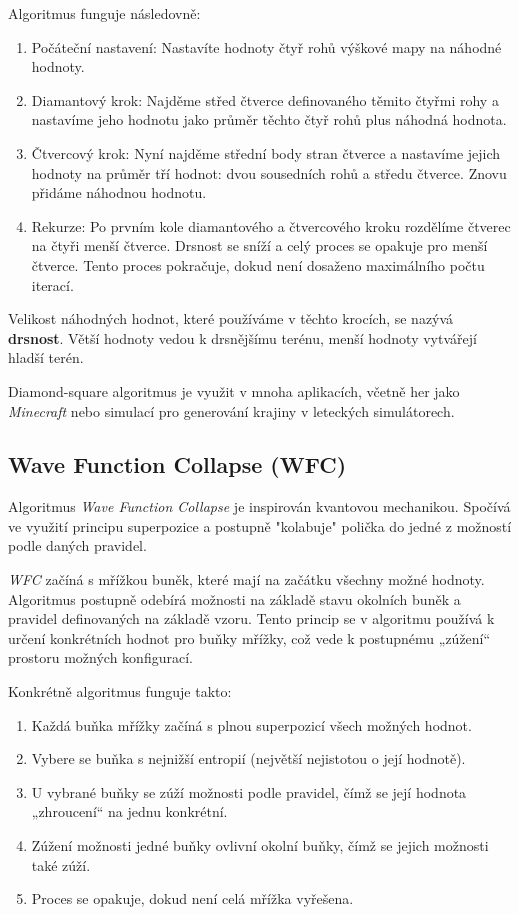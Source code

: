 Algoritmus funguje následovně:
\begin{enumerate}
    \item Počáteční nastavení: Nastavíte hodnoty čtyř rohů výškové mapy na náhodné hodnoty.
    \item Diamantový krok: Najděme střed čtverce definovaného těmito čtyřmi rohy a nastavíme jeho hodnotu jako průměr těchto čtyř rohů plus náhodná hodnota.
    \item Čtvercový krok: Nyní najděme střední body stran čtverce a nastavíme jejich hodnoty na průměr tří hodnot: dvou sousedních rohů a středu čtverce. Znovu přidáme náhodnou hodnotu.
    \item Rekurze: Po prvním kole diamantového a čtvercového kroku rozdělíme čtverec na čtyři menší čtverce. Drsnost se sníží a celý proces se opakuje pro menší čtverce. Tento proces pokračuje, dokud není dosaženo maximálního počtu iterací.
\end{enumerate}

Velikost náhodných hodnot, které používáme v těchto krocích, se nazývá \textbf{drsnost}. Větší hodnoty vedou k drsnějšímu terénu, menší hodnoty vytvářejí hladší terén.

Diamond-square algoritmus je využit v mnoha aplikacích, včetně her jako \textit{Minecraft} nebo simulací pro generování krajiny v leteckých simulátorech.

\subsection{Wave Function Collapse (WFC)}

Algoritmus \textit{Wave Function Collapse} je inspirován kvantovou mechanikou. Spočívá ve využití principu superpozice a postupně "kolabuje" polička do jedné z možností podle daných pravidel. 

\textit{WFC} začíná s mřížkou buněk, které mají na začátku všechny možné hodnoty. Algoritmus postupně odebírá možnosti na základě stavu okolních buněk a pravidel definovaných na základě vzoru. Tento princip se v algoritmu používá k určení konkrétních hodnot pro buňky mřížky, což vede k postupnému „zúžení“ prostoru možných konfigurací.

Konkrétně algoritmus funguje takto:
\begin{enumerate}
    \item Každá buňka mřížky začíná s plnou superpozicí všech možných hodnot.
    \item Vybere se buňka s nejnižší entropií (největší nejistotou o její hodnotě).
    \item U vybrané buňky se zúží možnosti podle pravidel, čímž se její hodnota „zhroucení“ na jednu konkrétní.
    \item Zúžení možnosti jedné buňky ovlivní okolní buňky, čímž se jejich možnosti také zúží.
    \item Proces se opakuje, dokud není celá mřížka vyřešena.
\end{enumerate}


